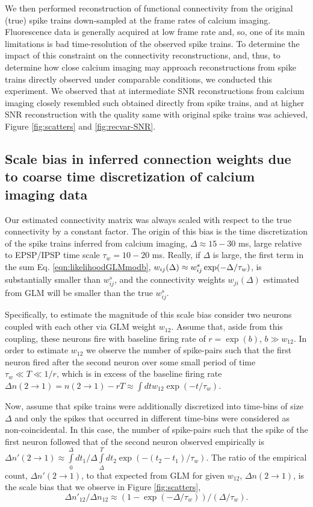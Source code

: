 We then performed reconstruction of functional connectivity from the original (true) spike trains down-sampled at the frame rates of calcium imaging.
Fluorescence data is generally acquired at low frame rate and, so, one of its main limitations is bad time-resolution of the observed spike trains. To determine the impact of this constraint on the connectivity reconstructions, and, thus, to determine how close calcium imaging may approach  reconstructions from spike trains directly observed under comparable conditions, we conducted this experiment.
We observed that at intermediate SNR reconstructions from calcium imaging closely resembled such obtained directly from spike trains, and at higher SNR reconstruction with the quality same with original spike trains was achieved, Figure \ref{fig:scatters} and \ref{fig:recvar-SNR}.

\subsection{Scale bias in inferred connection weights due to coarse time discretization of calcium imaging data}

Our estimated connectivity matrix was always scaled with respect to the true connectivity by a constant factor. The origin of this bias is the time discretization of the spike trains inferred from calcium imaging, $\Delta \approx 15-30$ ms, large relative to EPSP/IPSP time scale $\tau_w = 10-20$ ms. Really, if $\Delta$ is large, the first term in the sum Eq. \ref{eqn:likelihoodGLMmodb}, $w_{ij}(\Delta)\approx w_{ij}^s\exp(-\Delta/\tau_w)$, is substantially smaller than $w_{ij}^s$, and the connectivity weights $w_{ji}(\Delta)$ estimated from GLM will be smaller than the true $w^s_{ij}$.

Specifically, to estimate the magnitude of this scale bias consider two neurons coupled with each other via GLM weight $w_{12}$. Assume that, aside from this coupling, these neurons fire with baseline firing rate of $r=\exp(b)$, $b \gg w_{12}$.
In order to estimate $w_{12}$ we observe the number of spike-pairs such that the first neuron fired after the second neuron over some small period of time $\tau_w \ll T \ll 1/r$, which is in excess of the baseline firing rate
$\Delta n(2\rightarrow 1) = n(2\rightarrow 1) - r T \approx \int dt w_{12} \exp(-t/\tau_w)$.

Now, assume that spike trains were additionally discretized into time-bins of size $\Delta$ and only the spikes that occurred in different time-bins were considered as non-coincidental.
In this case, the number of spike-pairs such that the spike of the first neuron followed that of the second neuron observed empirically is $\Delta n'(2\rightarrow 1) \approx \int\limits_0^\Delta {dt_1}/{\Delta} \int\limits_{\Delta}^T dt_2 \exp(-(t_2-t_1)/\tau_w)$. The ratio of the empirical count, $\Delta n'(2\rightarrow 1)$, to that expected from GLM for given $w_{12}$, $\Delta n(2\rightarrow 1)$, is the scale bias that we observe in Figure \ref{fig:scatters},
\begin{equation}\label{eqn:bias}
\Delta n'_{12}/\Delta n_{12}\approx (1-\exp(-\Delta/\tau_w))/(\Delta/\tau_w).
\end{equation}

